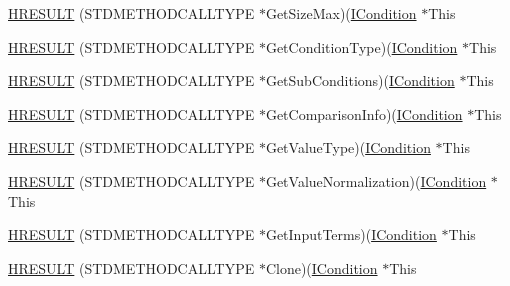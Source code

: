 \begin{DoxyCompactItemize}
\item 
\hyperlink{struct_i_condition_vtbl_ad3a04cfe3620c209d9c188b9329ff0df}{H\+R\+E\+S\+U\+LT} (S\+T\+D\+M\+E\+T\+H\+O\+D\+C\+A\+L\+L\+T\+Y\+PE $\ast$Get\+Size\+Max)(\hyperlink{structuredquery_8h_a44e1be344248ef67d647837c4aae42fa}{I\+Condition} $\ast$This
\item 
\hyperlink{struct_i_condition_vtbl_a455e9b21c4d95cb3c832d869a8b0951f}{H\+R\+E\+S\+U\+LT} (S\+T\+D\+M\+E\+T\+H\+O\+D\+C\+A\+L\+L\+T\+Y\+PE $\ast$Get\+Condition\+Type)(\hyperlink{structuredquery_8h_a44e1be344248ef67d647837c4aae42fa}{I\+Condition} $\ast$This
\item 
\hyperlink{struct_i_condition_vtbl_a69a12626f4c36c21f903a492011c7906}{H\+R\+E\+S\+U\+LT} (S\+T\+D\+M\+E\+T\+H\+O\+D\+C\+A\+L\+L\+T\+Y\+PE $\ast$Get\+Sub\+Conditions)(\hyperlink{structuredquery_8h_a44e1be344248ef67d647837c4aae42fa}{I\+Condition} $\ast$This
\item 
\hyperlink{struct_i_condition_vtbl_aab7a4162e12da3e2d4c4e40aacb6606d}{H\+R\+E\+S\+U\+LT} (S\+T\+D\+M\+E\+T\+H\+O\+D\+C\+A\+L\+L\+T\+Y\+PE $\ast$Get\+Comparison\+Info)(\hyperlink{structuredquery_8h_a44e1be344248ef67d647837c4aae42fa}{I\+Condition} $\ast$This
\item 
\hyperlink{struct_i_condition_vtbl_a44e5332cd0740d4ba70314e5918dcba6}{H\+R\+E\+S\+U\+LT} (S\+T\+D\+M\+E\+T\+H\+O\+D\+C\+A\+L\+L\+T\+Y\+PE $\ast$Get\+Value\+Type)(\hyperlink{structuredquery_8h_a44e1be344248ef67d647837c4aae42fa}{I\+Condition} $\ast$This
\item 
\hyperlink{struct_i_condition_vtbl_ac626b2a1b53c680f20c15c8248c4fe04}{H\+R\+E\+S\+U\+LT} (S\+T\+D\+M\+E\+T\+H\+O\+D\+C\+A\+L\+L\+T\+Y\+PE $\ast$Get\+Value\+Normalization)(\hyperlink{structuredquery_8h_a44e1be344248ef67d647837c4aae42fa}{I\+Condition} $\ast$This
\item 
\hyperlink{struct_i_condition_vtbl_a9b98e244c0f95cf599960a2883ee6ef0}{H\+R\+E\+S\+U\+LT} (S\+T\+D\+M\+E\+T\+H\+O\+D\+C\+A\+L\+L\+T\+Y\+PE $\ast$Get\+Input\+Terms)(\hyperlink{structuredquery_8h_a44e1be344248ef67d647837c4aae42fa}{I\+Condition} $\ast$This
\item 
\hyperlink{struct_i_condition_vtbl_a776acaccbc3dfa99b60484cb2b704f63}{H\+R\+E\+S\+U\+LT} (S\+T\+D\+M\+E\+T\+H\+O\+D\+C\+A\+L\+L\+T\+Y\+PE $\ast$Clone)(\hyperlink{structuredquery_8h_a44e1be344248ef67d647837c4aae42fa}{I\+Condition} $\ast$This
\end{DoxyCompactItemize}

